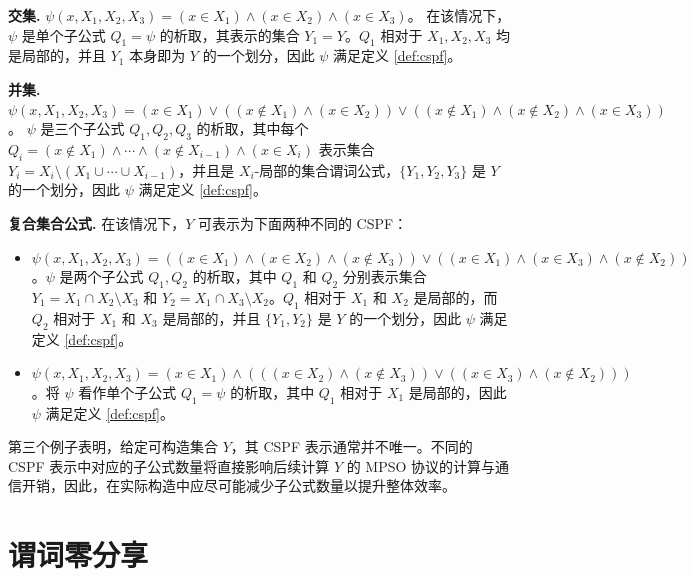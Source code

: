 \begin{trivlist}
    \item \textbf{交集.} $\psi(x, X_1, X_2, X_3) = (x \in X_1) \land (x \in X_2) \land (x \in X_3)$。
    在该情况下，$\psi$ 是单个子公式 $Q_1 = \psi$ 的析取，其表示的集合 $Y_1 = Y$。$Q_1$ 相对于 $X_1, X_2, X_3$ 均是局部的，并且 $Y_1$ 本身即为 $Y$ 的一个划分，因此 $\psi$ 满足定义 \ref{def:cspf}。
    \item \textbf{并集.} $\psi(x, X_1, X_2, X_3) = (x \in X_1) \lor ((x \notin X_1) \land (x \in X_2)) \lor ((x \notin X_1) \land (x \notin X_2) \land (x \in X_3))$。
    $\psi$ 是三个子公式 $Q_1, Q_2, Q_3$ 的析取，其中每个 $Q_i = (x \notin X_1) \land \cdots \land (x \notin X_{i-1}) \land (x \in X_i)$ 表示集合 $Y_i = X_i \setminus (X_1 \cup \cdots \cup X_{i-1})$，并且是 $X_i$-局部的集合谓词公式，$\{Y_1, Y_2, Y_3\}$ 是 $Y$ 的一个划分，因此 $\psi$ 满足定义 \ref{def:cspf}。
    \item \textbf{复合集合公式.} 在该情况下，$Y$ 可表示为下面两种不同的 CSPF：
    \begin{itemize}[itemsep=2pt,topsep=0pt,parsep=0pt,leftmargin=10pt]
      \item $\psi(x, X_1, X_2, X_3) = ((x \in X_1) \land (x \in X_2) \land (x \notin X_3)) \lor ((x \in X_1) \land (x \in X_3) \land (x \notin X_2))$。$\psi$ 是两个子公式 $Q_1, Q_2$ 的析取，其中 $Q_1$ 和 $Q_2$ 分别表示集合 $Y_1 = X_1 \cap X_2 \setminus X_3$ 和 $Y_2 = X_1 \cap X_3 \setminus X_2$。$Q_1$ 相对于 $X_1$ 和 $X_2$ 是局部的，而 $Q_2$ 相对于 $X_1$ 和 $X_3$ 是局部的，并且 $\{Y_1, Y_2\}$ 是 $Y$ 的一个划分，因此 $\psi$ 满足定义 \ref{def:cspf}。
      \item $\psi(x, X_1, X_2, X_3) = (x \in X_1) \land (((x \in X_2) \land (x \notin X_3)) \lor ((x \in X_3) \land (x \notin X_2)))$。将 $\psi$ 看作单个子公式 $Q_1 = \psi$ 的析取，其中 $Q_1$ 相对于 $X_1$ 是局部的，因此 $\psi$ 满足定义 \ref{def:cspf}。
      \end{itemize}
\end{trivlist}

第三个例子表明，给定可构造集合 $Y$，其 CSPF 表示通常并不唯一。不同的 CSPF 表示中对应的子公式数量将直接影响后续计算 $Y$ 的 MPSO 协议的计算与通信开销，因此，在实际构造中应尽可能减少子公式数量以提升整体效率。

\section{谓词零分享}~\label{sec:pzs}

